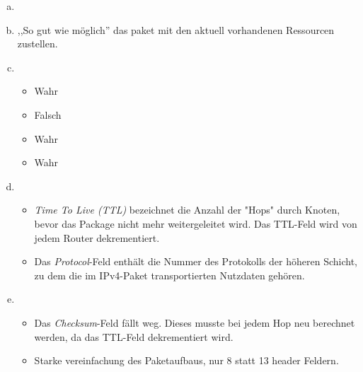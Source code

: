 

\usepackage{multicol,tabularx}
\usepackage{graphicx}
\usepackage{float}
\renewcommand{\arraystretch}{1.5}

\date{Mittwoch 4.12.2019}



\maketitle
\thispagestyle{fancy}


\begin{enumerate}[a)]
	\item \hfill 
		\begin{center}
			
		\end{center}

	\item ,,So gut wie möglich'' das paket mit den aktuell vorhandenen Ressourcen zustellen.
	\item \begin{itemize}
		\item Wahr
		\item Falsch
		\item Wahr
		\item Wahr
	\end{itemize}
	\item \begin{itemize}
		\item \textit{Time To Live (TTL)} bezeichnet die Anzahl der "Hops" durch Knoten, bevor das Package nicht mehr weitergeleitet wird. Das TTL-Feld wird von jedem Router dekrementiert.
		\item Das \textit{Protocol}-Feld enthält die Nummer des Protokolls der höheren Schicht, zu dem die im IPv4-Paket transportierten Nutzdaten gehören.
	\end{itemize}
	\item \begin{itemize}
		\item Das \textit{Checksum}-Feld fällt weg. Dieses musste bei jedem Hop neu berechnet werden, da das TTL-Feld dekrementiert wird.
		\item Starke vereinfachung des Paketaufbaus, nur 8 statt 13 header Feldern.
	\end{itemize}
\end{enumerate}



